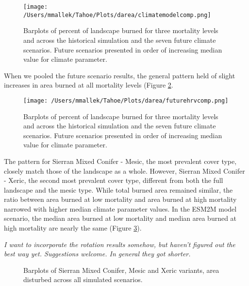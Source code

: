 \documentclass[12pt]{article}
\begin{document}
\begin{spacing}{1}
\begin{figure}[!htbp]
\centering
\texttt{[image: /Users/mmallek/Tahoe/Plots/darea/climatemodelcomp.png]}
\caption{Barplots of percent of landscape burned for three mortality levels and across the historical simulation and the seven future climate scenarios. Future scenarios presented in order of increasing median value for climate parameter.}
\label{climatemodelcomp}
\end{figure}

When we pooled the future scenario results, the general pattern held of slight increases in area burned at all mortality levels (Figure \ref{fig:futurehrvcomp}.

\begin{figure}[!htbp]
\centering
\texttt{[image: /Users/mmallek/Tahoe/Plots/darea/futurehrvcomp.png]}
\caption{Barplots of percent of landscape burned for three mortality levels and across the historical simulation and the seven future climate scenarios. Future scenarios presented in order of increasing median value for climate parameter.}
\label{fig:futurehrvcomp}
\end{figure}

The pattern for Sierran Mixed Conifer - Mesic, the most prevalent cover type, closely match those of the landscape as a whole. However, Sierran Mixed Conifer - Xeric, the second most prevalent cover type, different from both the full landscape and the mesic type. While total burned area remained similar, the ratio between area burned at low mortality and area burned at high mortality narrowed with higher median climate parameter values. In the ESM2M model scenario, the median area burned at low mortality and median area burned at high mortality are nearly the same (Figure \ref{fig:dareacomp_smc}).

\emph{I want to incorporate the rotation results somehow, but haven't figured out the best way yet. Suggestions welcome. In general they got shorter.}

\begin{figure}[!htbp]
  \centering
  \qquad
    \caption{Barplots of Sierran Mixed Conifer, Mesic and Xeric variants, area disturbed across all simulated scenarios.}
  \label{fig:dareacomp_smc}
\end{figure}


\end{spacing}
\end{document}
